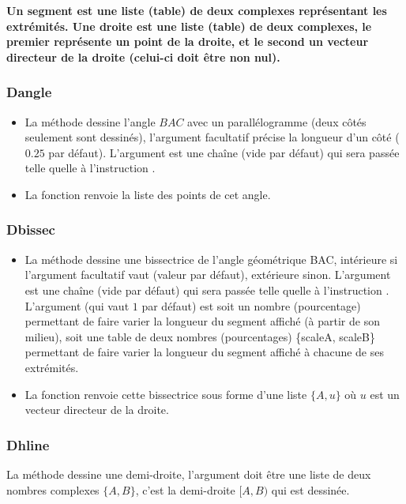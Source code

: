\textbf{Un segment est une liste (table) de deux complexes représentant les extrémités. Une droite est une liste (table) de deux complexes, le premier représente un point de la droite, et le second un vecteur directeur de la droite (celui-ci doit être non nul).}

\subsubsection{Dangle}
\begin{itemize}
    \item La méthode  dessine l'angle \(BAC\) avec un parallélogramme (deux côtés seulement sont dessinés), l'argument facultatif  précise la longueur d'un côté ($0.25$ par défaut). L'argument  est une chaîne (vide par défaut) qui sera passée telle quelle à l'instruction  \drawcmd.
    \item La fonction  renvoie la liste des points de cet angle.
\end{itemize}

\newcommand*{\arguScale}{%
L'argument \argu{scale} (qui vaut $1$ par défaut) est soit un nombre (pourcentage) permettant de faire varier la longueur du segment affiché (à partir de son milieu), soit une table de deux nombres (pourcentages) \{scaleA, scaleB\} permettant de faire varier la longueur du segment affiché à chacune de ses extrémités.
}%

\subsubsection{Dbissec}
\begin{itemize}
    \item La méthode  dessine une bissectrice de l'angle géométrique BAC, intérieure si l'argument facultatif  vaut \true (valeur par défaut), extérieure sinon. L'argument  est une chaîne (vide par défaut) qui sera passée telle quelle à l'instruction \drawcmd. \arguScale
  \item La fonction  renvoie cette bissectrice sous forme d'une liste $\{A,u\}$ où $u$ est un vecteur directeur de la droite.
\end{itemize}

\subsubsection{Dhline}
La méthode  dessine une demi-droite, l'argument  doit être une liste de deux nombres complexes $\{A,B\}$, c'est la demi-droite $[A,B)$ qui est dessinée.

